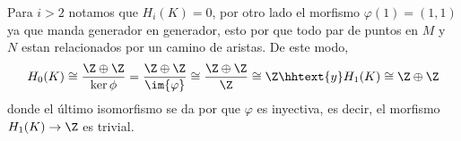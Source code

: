\documentclass{article}
\begin{document}
\vspace{2mm}
\centerline{
}

\vspace{2mm}
\noindent Para $i>2$ notamos que $H_{i}(K)=0$, por otro lado el morfismo $\varphi(1)=(1,1)$ ya que
manda generador en generador, esto por que todo par de puntos en $M$ y $N$ estan relacionados por
un camino de aristas. De este modo,
\begin{equation*}
    H_{0}(K)\cong\frac{\Z\oplus\Z}{\ker{\phi}}=\frac{\Z\oplus\Z}{\im{\varphi}}
    \cong\frac{\Z\oplus\Z}{\Z}\cong\Z
    \hhtext{y}
    H_{1}(K)\cong\Z\oplus\Z
\end{equation*}
donde el último isomorfismo se da por que $\varphi$ es inyectiva, es decir, el morfismo 
$H_{1}(K)\to\Z$ es trivial.

\end{document}
